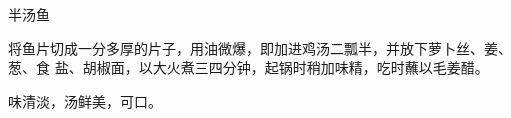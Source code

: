 %
%
%
%
%
%
%
\begin{recipe}{半汤鱼}

\ingredients


\preparation

将鱼片切成一分多厚的片子，用油微爆，即加进鸡汤二瓢半，并放下萝卜丝、姜、葱、食
盐、胡椒面，以大火煮三四分钟，起锅时稍加味精，吃时蘸以毛姜醋。

\features

味清淡，汤鲜美，可口。

\end{recipe}

